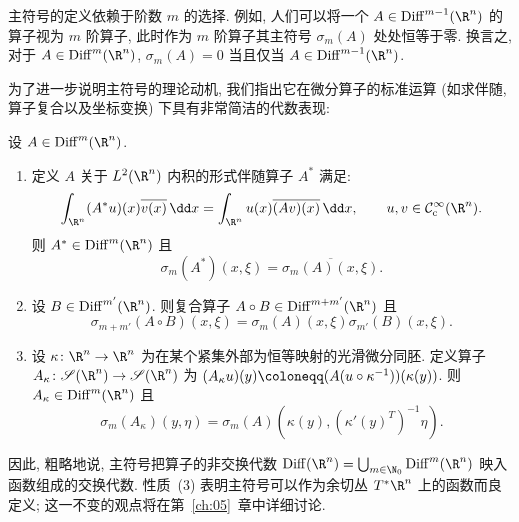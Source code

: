 \begin{remark}[阶数的依赖性]\label{rem:3.2}
主符号的定义依赖于阶数 $m$ 的选择. 例如, 人们可以将一个 $A \in \Diff^{m-1}(\R^n)$ 的算子视为 $m$ 阶算子, 此时作为 $m$ 阶算子其主符号 $\sigma_m(A)$ 处处恒等于零. 换言之, 对于 $A \in \Diff^m(\R^n)$, $\sigma_m(A) = 0$ 当且仅当 $A \in \Diff^{m-1}(\R^n)$.
\end{remark}

为了进一步说明主符号的理论动机, 我们指出它在微分算子的标准运算 (如求伴随, 算子复合以及坐标变换) 下具有非常简洁的代数表现:

\begin{proposition}[主符号的代数性质]\label{prop:3.3}
设 $A \in \Diff^m(\R^n)$.
\begin{enumerate}
    \item 定义 $A$ 关于 $L^2(\R^n)$ 内积的形式伴随算子 $A^*$ 满足:
    \[
        \int_{\R^n} (A^* u)(x) \overline{v(x)} \,\dd x = \int_{\R^n} u(x) \overline{(A v)(x)} \,\dd x, \qquad u, v \in \SmoothComp(\R^n).
    \]
    则 $A^* \in \Diff^m(\R^n)$ 且
    \begin{equation}\label{eq:3.5}
        \sigma_m(A^*)(x, \xi) = \overline{\sigma_m(A)(x, \xi)}.
    \end{equation}
    \item 设 $B \in \Diff^{m'}(\R^n)$. 则复合算子 $A \circ B \in \Diff^{m+m'}(\R^n)$ 且
    \begin{equation}\label{eq:3.6}
        \sigma_{m+m'}(A \circ B)(x, \xi) = \sigma_m(A)(x, \xi) \sigma_{m'}(B)(x, \xi).
    \end{equation}
    \item 设 $\kappa \colon \R^n \to \R^n$ 为在某个紧集外部为恒等映射的光滑微分同胚. 定义算子 $A_\kappa \colon \Schwartz(\R^n) \to \Schwartz(\R^n)$ 为 $(A_\kappa u)(y) \defeq (A(u \circ \kappa^{-1}))(\kappa(y))$. 则 $A_\kappa \in \Diff^m(\R^n)$ 且
    \begin{equation}\label{eq:3.7}
        \sigma_m(A_\kappa)(y, \eta) = \sigma_m(A)\left( \kappa(y), (\kappa'(y)^T)^{-1} \eta \right).
    \end{equation}
\end{enumerate}
\end{proposition}

因此, 粗略地说, 主符号把算子的非交换代数 $\Diff(\R^n) = \bigcup_{m \in \N_0} \Diff^m(\R^n)$ 映入函数组成的交换代数. 性质~(3) 表明主符号可以作为余切丛 $T^* \R^n$ 上的函数而良定义; 这一不变的观点将在第~\ref{ch:05}~章中详细讨论.

